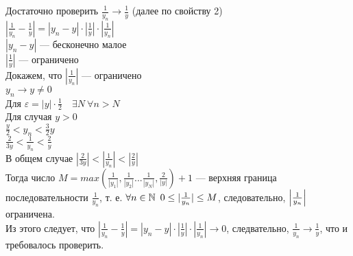 Достаточно проверить $\frac{1}{y_n} \rightarrow \frac{1}{y}$ (далее по свойству 2)\\
$|\frac{1}{y_n} - \frac{1}{y}| = |y_n - y|\cdot |\frac{1}{y}| \cdot |\frac{1}{y_n}|$\\
$|y_n - y|$ --- бесконечно малое\\
$|\frac{1}{y}|$ --- ограничено\\
Докажем, что $|\frac{1}{y_n}|$ --- ограничено\\
$y_n \rightarrow y \neq 0$\\
Для $\varepsilon = |y| \cdot \frac{1}{2}\quad \exists N \ \forall n > N$\\
Для случая $y > 0$\\
$\frac{y}{2} < y_n < \frac{3}{2}y$\\
$\frac{2}{3y} < \frac{1}{y_n} < \frac{2}{y}$\\
В общем случае $|\frac{2}{3y}| < |\frac{1}{y_n}| < |\frac{2}{y}|$\\
Тогда число $M = max(\frac{1}{|y_1|}, \frac{1}{|y_2|} ... \frac{1}{|y_N|}, \frac{2}{|y|})+1$ --- верхняя граница последовательности $\frac{1}{y_n}$, т. е. $\forall n \in \operatorname*{\mathbb{N}} \ 0 \leq |\frac{1}{y_n}| \leq M$, следовательно, $\left| \frac{1}{y_n} \right|$ ограничена.\\
Из этого следует, что $|\frac{1}{y_n} - \frac{1}{y}| = |y_n - y|\cdot |\frac{1}{y}| \cdot |\frac{1}{y_n}| \longrightarrow 0$, следвательно, $\frac{1}{y_n} \rightarrow \frac{1}{y}$, что и требовалось проверить.\\

\newpage
